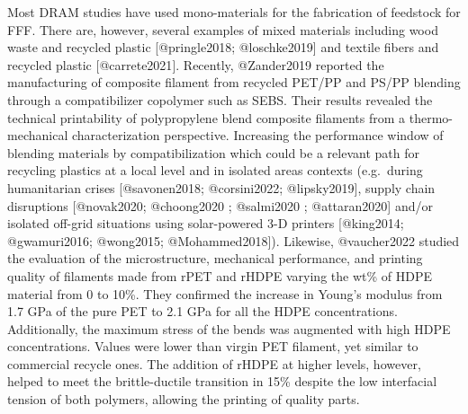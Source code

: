 \documentclass[
  letterpaper,
  DIV=11,
  numbers=noendperiod]{scrartcl}
\begin{document}
Most DRAM studies have used mono-materials for the fabrication of
feedstock for FFF. There are, however, several examples of mixed
materials including wood waste and recycled plastic {[}@pringle2018;
@loschke2019{]} and textile fibers and recycled plastic
{[}@carrete2021{]}. Recently, @Zander2019 reported the manufacturing of
composite filament from recycled PET/PP and PS/PP blending through a
compatibilizer copolymer such as SEBS. Their results revealed the
technical printability of polypropylene blend composite filaments from a
thermo-mechanical characterization perspective. Increasing the
performance window of blending materials by compatibilization which
could be a relevant path for recycling plastics at a local level and in
isolated areas contexts (e.g.~during humanitarian crises
{[}@savonen2018; @corsini2022; @lipsky2019{]}, supply chain disruptions
{[}@novak2020; @choong2020 ; @salmi2020 ; @attaran2020{]} and/or
isolated off-grid situations using solar-powered 3-D printers
{[}@king2014; @gwamuri2016; @wong2015; @Mohammed2018{]}). Likewise,
@vaucher2022 studied the evaluation of the microstructure, mechanical
performance, and printing quality of filaments made from rPET and rHDPE
varying the wt\% of HDPE material from 0 to 10\%. They confirmed the
increase in Young's modulus from 1.7 GPa of the pure PET to 2.1 GPa for
all the HDPE concentrations. Additionally, the maximum stress of the
bends was augmented with high HDPE concentrations. Values were lower
than virgin PET filament, yet similar to commercial recycle ones. The
addition of rHDPE at higher levels, however, helped to meet the
brittle-ductile transition in 15\% despite the low interfacial tension
of both polymers, allowing the printing of quality parts.
\end{document}
